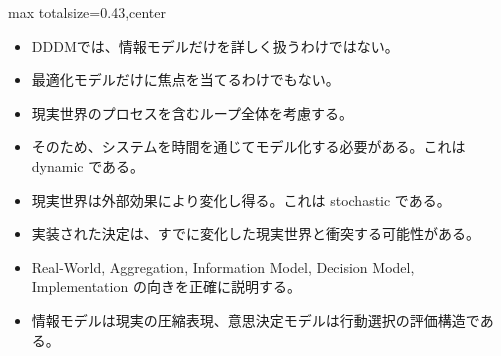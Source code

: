 \clearpage
{}
\begin{minipage}[t]{0.405\textwidth}
\begin{adjustbox}{max totalsize={\textwidth}{0.43\textheight},center}
\begin{minipage}{\textwidth}\scriptsize
{}\begin{itemize}
\item DDDMでは、情報モデルだけを詳しく扱うわけではない。
\item 最適化モデルだけに焦点を当てるわけでもない。
\item 現実世界のプロセスを含むループ全体を考慮する。
\item そのため、システムを時間を通じてモデル化する必要がある。これは dynamic である。
\item 現実世界は外部効果により変化し得る。これは stochastic である。
\item 実装された決定は、すでに変化した現実世界と衝突する可能性がある。
\end{itemize}\begin{itemize}
\item Real-World, Aggregation, Information Model, Decision Model, Implementation の向きを正確に説明する。
\item 情報モデルは現実の圧縮表現、意思決定モデルは行動選択の評価構造である。
\end{itemize}
\end{minipage}
\end{adjustbox}
\end{minipage}\hfill

